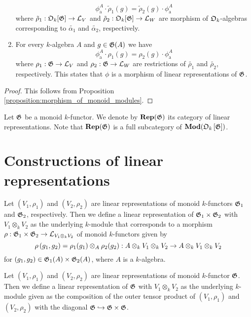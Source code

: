 \begin{corollary}
\begin{enumerate}[label=\emph{\textbf{(\roman*)}}, leftmargin=1.5em]
$$\phi_{\mathrm{a}}^A \cdot \tilde{\rho}_1(g) = \tilde{\rho}_2(g) \cdot \phi_{\mathrm{a}}^A$$
where $\tilde{\rho}_1:{\mathfrak O}_k[{\mathfrak G}] \rightarrow {\mathcal L}_V$ and $\tilde{\rho}_2:{\mathfrak O}_k[{\mathfrak G}] \rightarrow {\mathcal L}_W$ are morphism of ${\mathfrak O}_k$-algebras corresponding to $\tilde{\alpha_1}$ and $\tilde{\alpha_2}$, respectively.
\item For every $k$-algebra $A$ and $g \in {\mathfrak G}(A)$ we have
$$\phi_{\mathrm{a}}^A \cdot \rho_1(g) = \rho_2(g) \cdot \phi_{\mathrm{a}}^A$$
where $\rho_1:{\mathfrak G} \rightarrow {\mathcal L}_V$ and $\rho_2:{\mathfrak G} \rightarrow {\mathcal L}_W$ are restrictions of $\tilde{\rho_1}$ and $\tilde{\rho_2}$, respectively. This states that $\phi$ is a morphism of linear representations of ${\mathfrak G}$.
\end{enumerate}
\end{corollary}
\begin{proof}
This follows from Proposition \ref{proposition:morphism_of_monoid_modules}.
\end{proof}
\noindent
Let ${\mathfrak G}$ be a monoid $k$-functor. We denote by $\mathbf{Rep}({\mathfrak G})$ its category of linear representations. Note that $\mathbf{Rep}({\mathfrak G})$ is a full subcategory of $\mathbf{Mod}({\mathfrak O}_k\left[{\mathfrak G}\right])$.

\section{Constructions of linear representations}

\begin{example}\label{example:outer_tensor_product}
Let $(V_1,\rho_1)$ and $(V_2,\rho_2)$ are linear representations of monoid $k$-functors ${\mathfrak G}_1$ and ${\mathfrak G}_2$, respectively. Then we define a linear representation of ${\mathfrak G}_1\times {\mathfrak G}_2$ with $V_1\otimes_k V_2$ as the underlying $k$-module that corresponds to a morphism $\rho:{\mathfrak G}_1\times {\mathfrak G}_2 \rightarrow {\mathcal L}_{V_1\otimes_kV_2}$ of monoid $k$-functors given by
$$\rho\left(g_1,g_2\right) = \rho_1(g_1)\otimes_A\rho_2(g_2):A\otimes_kV_1\otimes_kV_2\rightarrow A\otimes_kV_1\otimes_kV_2$$
for $(g_1,g_2)\in {\mathfrak G}_1(A)\times {\mathfrak G}_2(A)$, where $A$ is a $k$-algebra.
\end{example}

\begin{example}\label{example:tensor_product}
Let $(V_1,\rho_1)$ and $(V_2,\rho_2)$ are linear representations of monoid $k$-functor ${\mathfrak G}$. Then we define a linear representation of ${\mathfrak G}$ with $V_1\otimes_k V_2$ as the underlying $k$-module given as the composition of the outer tensor product of $(V_1,\rho_1)$ and $(V_2,\rho_2)$ with the diagonal ${\mathfrak G}\hookrightarrow {\mathfrak G}\times {\mathfrak G}$.
\end{example}

